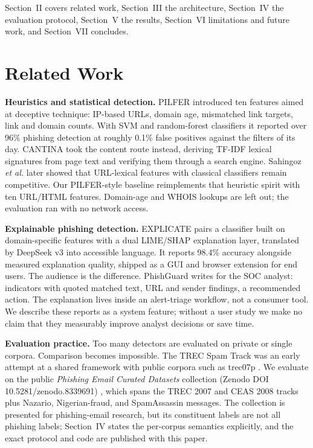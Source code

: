 \documentclass[conference]{IEEEtran}
\begin{document}
Section~II covers related work, Section~III the architecture, Section~IV the
evaluation protocol, Section~V the results, Section~VI limitations and future
work, and Section~VII concludes.

\section{Related Work}
\textbf{Heuristics and statistical detection.} PILFER \cite{pilfer}
introduced ten features aimed at deceptive technique: IP-based URLs, domain
age, mismatched link targets, link and domain counts. With SVM and
random-forest classifiers it reported over 96\% phishing detection at roughly
0.1\% false positives against the filters of its day. CANTINA \cite{cantina}
took the content route instead, deriving TF-IDF lexical signatures from page
text and verifying them through a search engine. Sahingoz \textit{et al.}
\cite{sahingoz2019} later showed that URL-lexical features with classical
classifiers remain competitive. Our PILFER-style baseline reimplements that
heuristic spirit with ten URL/HTML features. Domain-age and WHOIS lookups are
left out; the evaluation ran with no network access.

\textbf{Explainable phishing detection.} EXPLICATE \cite{explicate} pairs a
classifier built on domain-specific features with a dual LIME/SHAP
explanation layer, translated by DeepSeek v3 into accessible language. It
reports 98.4\% accuracy alongside measured explanation quality, shipped as a
GUI and browser extension for end users. The audience is the difference.
PhishGuard writes for the SOC analyst: indicators with quoted matched text,
URL and sender findings, a recommended action. The explanation lives inside
an alert-triage workflow, not a consumer tool. We describe these reports as a
system feature; without a user study we make no claim that they measurably
improve analyst decisions or save time.

\textbf{Evaluation practice.} Too many detectors are evaluated on private or
single corpora. Comparison becomes impossible. The TREC Spam Track was an
early attempt at a shared framework with public corpora such as trec07p
\cite{trec07}. We evaluate on the public \textit{Phishing Email Curated
Datasets} collection (Zenodo DOI 10.5281/zenodo.8339691)
\cite{phishcurated,champa2024curated}, which spans the TREC 2007 and CEAS
2008 tracks plus Nazario, Nigerian-fraud, and SpamAssassin messages. The
collection is presented for phishing-email research, but its constituent
labels are not all phishing labels; Section~IV states the per-corpus
semantics explicitly, and the exact protocol and code are published with this
paper.
\end{document}
